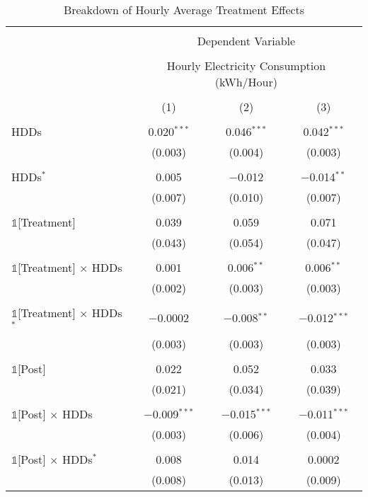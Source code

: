 
\begin{table}[!htbp] \centering 
  \caption{Breakdown of Hourly Average Treatment Effects} 
  \label{Table:Breakdown-of-Hourly-ATEs} 
\small 
\begin{tabular}{@{\extracolsep{95pt}}lccc} 
\\[-1.8ex]\hline 
\hline \\[-1.8ex] 
 & \multicolumn{3}{c}{Dependent Variable} \\ 
\cline{2-4} 
\\[-1.8ex] & \multicolumn{3}{c}{Hourly Electricity Consumption  (kWh/Hour)} \\ 
\\[-1.8ex] & (1) & (2) & (3)\\ 
\hline \\[-1.8ex] 
 HDDs & 0.020$^{***}$ & 0.046$^{***}$ & 0.042$^{***}$ \\ 
  & (0.003) & (0.004) & (0.003) \\ 
  & & & \\ 
 HDDs$^{*}$ & 0.005 & $-$0.012 & $-$0.014$^{**}$ \\ 
  & (0.007) & (0.010) & (0.007) \\ 
  & & & \\ 
 $\mathbb{1}$[Treatment] & 0.039 & 0.059 & 0.071 \\ 
  & (0.043) & (0.054) & (0.047) \\ 
  & & & \\ 
 $\mathbb{1}$[Treatment] $\times$ HDDs & 0.001 & 0.006$^{**}$ & 0.006$^{**}$ \\ 
  & (0.002) & (0.003) & (0.003) \\ 
  & & & \\ 
 $\mathbb{1}$[Treatment] $\times$ HDDs$^{*}$ & $-$0.0002 & $-$0.008$^{**}$ & $-$0.012$^{***}$ \\ 
  & (0.003) & (0.003) & (0.003) \\ 
  & & & \\ 
 $\mathbb{1}$[Post] & 0.022 & 0.052 & 0.033 \\ 
  & (0.021) & (0.034) & (0.039) \\ 
  & & & \\ 
 $\mathbb{1}$[Post] $\times$ HDDs & $-$0.009$^{***}$ & $-$0.015$^{***}$ & $-$0.011$^{***}$ \\ 
  & (0.003) & (0.006) & (0.004) \\ 
  & & & \\ 
 $\mathbb{1}$[Post] $\times$ HDDs$^{*}$ & 0.008 & 0.014 & 0.0002 \\ 
  & (0.008) & (0.013) & (0.009) \\ 

\end{tabular}
\end{table}
